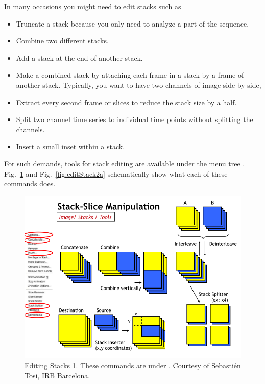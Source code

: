 In many occasions you might need to edit stacks such as
\begin{itemize}
\item Truncate a stack because you only need to analyze a part of the sequence.
\item Combine two different stacks.
\item Add a stack at the end of another stack.
\item Make a combined stack by attaching each frame in a stack by a frame of another stack. Typically, you want to have two channels of image side-by side,
\item Extract every second frame or slices to reduce the stack size by a half. 
\item Split two channel time series to individual time points without splitting the channels. 
\item Insert a small inset within a stack. 
\end{itemize}
For such demands, tools for stack editing are available under the menu tree . Fig.~\ref{fig:editStack1} and Fig.~\ref{fig:editStack2a} schematically show what each of these commands does. 
\begin{figure}[hbtp]
\begin{center}
\includegraphics[width=\textwidth]{fig/stackEditing1.png}
\caption{Editing Stacks 1. These commands are under . Courtesy of Sebasti\'{e}n Tosi, IRB Barcelona.}
\label{fig:editStack1}
\end{center}
\end{figure}


